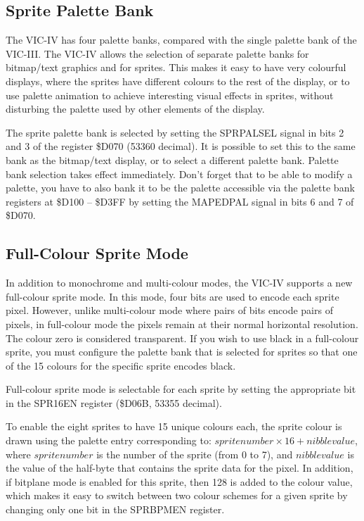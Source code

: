 \subsection{Sprite Palette Bank}

The VIC-IV has four palette banks, compared with the single palette bank of the VIC-III.
The VIC-IV allows the selection of separate palette banks for bitmap/text graphics and for sprites.  This makes it easy to have
very colourful displays, where the sprites have different colours to the rest of the display, or to use palette animation to achieve
interesting visual effects in sprites, without disturbing the palette used by other elements of the display.

The sprite palette bank is selected by setting the SPRPALSEL signal in bits 2 and 3 of the register \$D070 (53360 decimal).
It is possible to set this to the same bank as the bitmap/text display, or to select a different palette bank.
Palette bank selection takes effect immediately.  Don't forget that to be able to modify a palette, you have to also bank it
to be the palette accessible via the palette bank registers at \$D100 -- \$D3FF by setting the MAPEDPAL signal in bits 6 and 7 of
\$D070.

\subsection{Full-Colour Sprite Mode}

In addition to monochrome and multi-colour modes, the VIC-IV supports a new full-colour sprite mode.  In this mode, four bits are used to
encode each sprite pixel.  However, unlike multi-colour mode where pairs of bits encode pairs of pixels, in full-colour mode the pixels
remain at their normal horizontal resolution.  The colour zero is considered transparent. If you wish to use black in a full-colour sprite, 
you must configure the palette bank that is selected for sprites so that one of the 15 colours for the specific sprite encodes black.

Full-colour sprite mode is selectable for each sprite by setting the appropriate bit in the SPR16EN register (\$D06B, 53355 decimal).

To enable the eight sprites to have 15 unique colours each, the sprite colour is drawn using the palette entry corresponding to:
$sprite number \times 16 + nibble value$, where $sprite number$ is the number of the sprite (from 0 to 7), and $nibble value$ is the value
of the half-byte that contains the sprite data for the pixel.  In addition, if bitplane mode is enabled for this sprite, then 128 is
added to the colour value, which makes it easy to switch between two colour schemes for a given sprite by changing only one bit in the
SPRBPMEN register.

